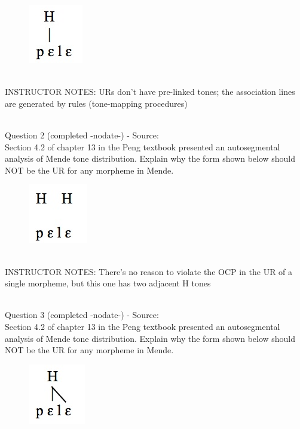 \documentclass[12pt]{article}
\begin{document}
\begin{figure}[H]
\includegraphics{../images/mende_house_a.png}
\end{figure}

~\\
INSTRUCTOR NOTES: URs don't have pre-linked tones; the association lines are generated by rules (tone-mapping procedures)


~\\

{\large Question 2} (completed -nodate-) - Source: \\

Section 4.2 of chapter 13 in the Peng textbook presented an autosegmental analysis of Mende tone distribution. Explain why the form shown below should NOT be the UR for any morpheme in Mende.\\

\begin{figure}[H]
\includegraphics{../images/mende_house_b.png}
\end{figure}

~\\
INSTRUCTOR NOTES: There's no reason to violate the OCP in the UR of a single morpheme, but this one has two adjacent H tones


~\\

{\large Question 3} (completed -nodate-) - Source: \\

Section 4.2 of chapter 13 in the Peng textbook presented an autosegmental analysis of Mende tone distribution. Explain why the form shown below should NOT be the UR for any morpheme in Mende.\\

\begin{figure}[H]
\includegraphics{../images/mende_house_d.png}
\end{figure}
\end{document}
